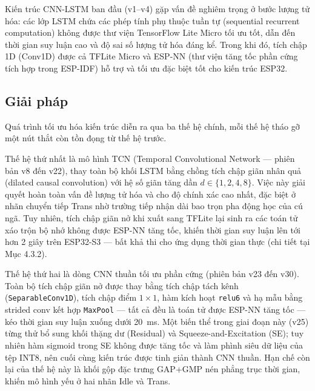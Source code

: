 \documentclass[../DoAn.tex]{subfiles}
\begin{document}
Kiến trúc CNN-LSTM ban đầu (v1--v4) gặp vấn đề nghiêm trọng ở bước lượng tử hóa: các lớp LSTM chứa các phép tính phụ thuộc tuần tự (sequential recurrent computation) không được thư viện TensorFlow Lite Micro tối ưu tốt, dẫn đến thời gian suy luận cao và độ sai số lượng tử hóa đáng kể. Trong khi đó, tích chập 1D (Conv1D) được cả TFLite Micro và ESP-NN (thư viện tăng tốc phần cứng tích hợp trong ESP-IDF) hỗ trợ và tối ưu đặc biệt tốt cho kiến trúc ESP32.

\subsection{Giải pháp}

Quá trình tối ưu hóa kiến trúc diễn ra qua ba thế hệ chính, mỗi thế hệ tháo gỡ một nút thắt còn tồn đọng từ thế hệ trước.

Thế hệ thứ nhất là mô hình TCN (Temporal Convolutional Network --- phiên bản v8 đến v22), thay toàn bộ khối LSTM bằng chồng tích chập giãn nhân quả (dilated causal convolution) với hệ số giãn tăng dần $d \in \{1, 2, 4, 8\}$. Việc này giải quyết hoàn toàn vấn đề lượng tử hóa và cho độ chính xác cao nhất, đặc biệt ở nhãn chuyển tiếp Trans nhờ trường tiếp nhận dài bao trọn pha động học của cú ngã. Tuy nhiên, tích chập giãn nở khi xuất sang TFLite lại sinh ra các toán tử xáo trộn bộ nhớ không được ESP-NN tăng tốc, khiến thời gian suy luận lên tới hơn 2 giây trên ESP32-S3 --- bất khả thi cho ứng dụng thời gian thực (chi tiết tại Mục 4.3.2).

Thế hệ thứ hai là dòng CNN thuần tối ưu phần cứng (phiên bản v23 đến v30). Toàn bộ tích chập giãn nở được thay bằng tích chập tách kênh (\texttt{SeparableConv1D}), tích chập điểm $1 \times 1$, hàm kích hoạt \texttt{relu6} và hạ mẫu bằng strided conv kết hợp \texttt{MaxPool} --- tất cả đều là toán tử được ESP-NN tăng tốc --- kéo thời gian suy luận xuống dưới 20~ms. Một biến thể trong giai đoạn này (v25) từng thử bổ sung khối thặng dư (Residual) và Squeeze-and-Excitation (SE); tuy nhiên hàm sigmoid trong SE không được tăng tốc và làm phình siêu dữ liệu của tệp INT8, nên cuối cùng kiến trúc được tinh giản thành CNN thuần. Hạn chế còn lại của thế hệ này là khối gộp đặc trưng GAP+GMP nén phẳng trục thời gian, khiến mô hình yếu ở hai nhãn Idle và Trans.
\end{document}
